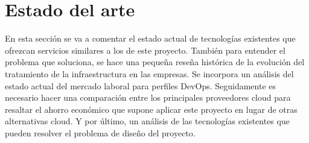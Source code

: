 \chapter{Estado del arte}
	\begin{text}
		En esta sección se va a comentar el estado actual de tecnologías existentes que ofrezcan servicios similares a los de este proyecto. También para entender el problema que soluciona, se hace una pequeña reseña histórica de la evolución del tratamiento de la infraestructura en las empresas. Se incorpora un análisis del estado actual del mercado laboral para perfiles DevOps. Seguidamente es necesario hacer una comparación entre los principales proveedores cloud para resaltar el ahorro económico que supone aplicar este proyecto en lugar de otras alternativas cloud. Y por último, un análisis de las tecnologías existentes que pueden resolver el problema de diseño del proyecto.
	\end{text}

